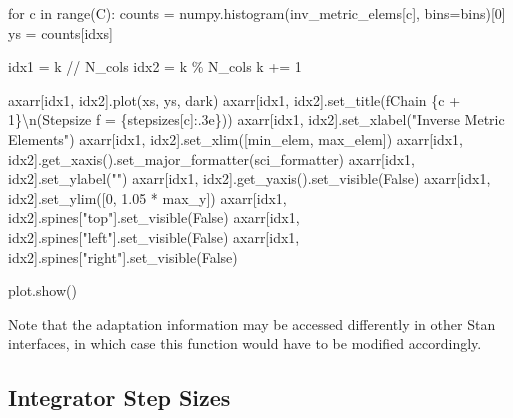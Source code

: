 \documentclass[
  letterpaper,
  DIV=11,
  numbers=noendperiod]{scrartcl}
\newenvironment{Shaded}{\begin{snugshade}}{\end{snugshade}}
\newcommand{\BuiltInTok}[1]{\textcolor[rgb]{0.00,0.23,0.31}{#1}}
\newcommand{\CharTok}[1]{\textcolor[rgb]{0.13,0.47,0.30}{#1}}
\newcommand{\ControlFlowTok}[1]{\textcolor[rgb]{0.00,0.23,0.31}{#1}}
\newcommand{\DecValTok}[1]{\textcolor[rgb]{0.68,0.00,0.00}{#1}}
\newcommand{\FloatTok}[1]{\textcolor[rgb]{0.68,0.00,0.00}{#1}}
\newcommand{\KeywordTok}[1]{\textcolor[rgb]{0.00,0.23,0.31}{#1}}
\newcommand{\NormalTok}[1]{\textcolor[rgb]{0.00,0.23,0.31}{#1}}
\newcommand{\OperatorTok}[1]{\textcolor[rgb]{0.37,0.37,0.37}{#1}}
\newcommand{\SpecialCharTok}[1]{\textcolor[rgb]{0.37,0.37,0.37}{#1}}
\newcommand{\SpecialStringTok}[1]{\textcolor[rgb]{0.13,0.47,0.30}{#1}}
\newcommand{\StringTok}[1]{\textcolor[rgb]{0.13,0.47,0.30}{#1}}
\newcommand{\VariableTok}[1]{\textcolor[rgb]{0.07,0.07,0.07}{#1}}
\begin{document}
\begin{Shaded}
\begin{Highlighting}[]
  \ControlFlowTok{for}\NormalTok{ c }\KeywordTok{in} \BuiltInTok{range}\NormalTok{(C):}
\NormalTok{    counts }\OperatorTok{=}\NormalTok{ numpy.histogram(inv\_metric\_elems[c], bins}\OperatorTok{=}\NormalTok{bins)[}\DecValTok{0}\NormalTok{]}
\NormalTok{    ys }\OperatorTok{=}\NormalTok{ counts[idxs]}
  
\NormalTok{    idx1 }\OperatorTok{=}\NormalTok{ k }\OperatorTok{//}\NormalTok{ N\_cols}
\NormalTok{    idx2 }\OperatorTok{=}\NormalTok{ k }\OperatorTok{\%}\NormalTok{ N\_cols}
\NormalTok{    k }\OperatorTok{+=} \DecValTok{1}
  
\NormalTok{    axarr[idx1, idx2].plot(xs, ys, dark)}
\NormalTok{    axarr[idx1, idx2].set\_title(}\SpecialStringTok{f\textquotesingle{}Chain }\SpecialCharTok{\{}\NormalTok{c }\OperatorTok{+} \DecValTok{1}\SpecialCharTok{\}}\CharTok{\textbackslash{}n}\SpecialStringTok{(Stepsize\textquotesingle{}}
                                \SpecialStringTok{f\textquotesingle{} = }\SpecialCharTok{\{}\NormalTok{stepsizes[c]}\SpecialCharTok{:.3e\}}\SpecialStringTok{)\textquotesingle{}}\NormalTok{)}
\NormalTok{    axarr[idx1, idx2].set\_xlabel(}\StringTok{"Inverse Metric Elements"}\NormalTok{)}
\NormalTok{    axarr[idx1, idx2].set\_xlim([min\_elem, max\_elem])}
\NormalTok{    axarr[idx1, idx2].get\_xaxis().set\_major\_formatter(sci\_formatter)}
\NormalTok{    axarr[idx1, idx2].set\_ylabel(}\StringTok{""}\NormalTok{)}
\NormalTok{    axarr[idx1, idx2].get\_yaxis().set\_visible(}\VariableTok{False}\NormalTok{)}
\NormalTok{    axarr[idx1, idx2].set\_ylim([}\DecValTok{0}\NormalTok{, }\FloatTok{1.05} \OperatorTok{*}\NormalTok{ max\_y])}
\NormalTok{    axarr[idx1, idx2].spines[}\StringTok{"top"}\NormalTok{].set\_visible(}\VariableTok{False}\NormalTok{)}
\NormalTok{    axarr[idx1, idx2].spines[}\StringTok{"left"}\NormalTok{].set\_visible(}\VariableTok{False}\NormalTok{)}
\NormalTok{    axarr[idx1, idx2].spines[}\StringTok{"right"}\NormalTok{].set\_visible(}\VariableTok{False}\NormalTok{)}
  
\NormalTok{  plot.show()}
\end{Highlighting}
\end{Shaded}

Note that the adaptation information may be accessed differently in
other Stan interfaces, in which case this function would have to be
modified accordingly.

\subsection{Integrator Step Sizes}\label{integrator-step-sizes}
\end{document}
